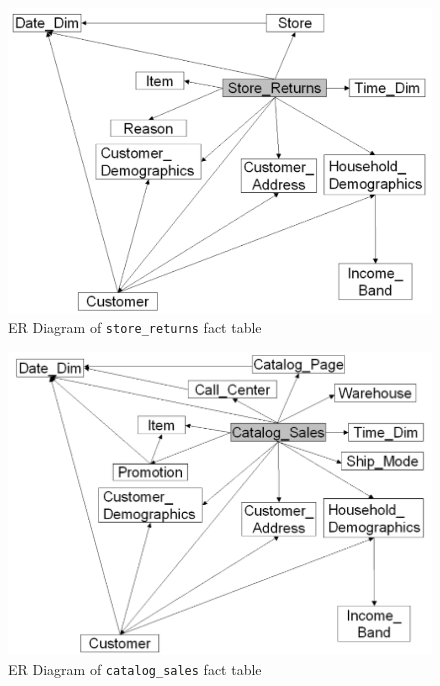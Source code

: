 \documentclass[conference]{IEEEtran}
\begin{document}
\begin{figure}[htbp]
    \centering
    \includegraphics[width=\linewidth]{figures/fact_table_store_returns.png}
    \caption{ER Diagram of \texttt{store\_returns} fact table }
    \label{fig:store_returns}
\end{figure}

\begin{figure}[htbp]
    \centering
    \includegraphics[width=\linewidth]{figures/fact_table_catalog_sales.png}
    \caption{ER Diagram of \texttt{catalog\_sales} fact table }
    \label{fig:catalog_sales}
\end{figure}
\end{document}
